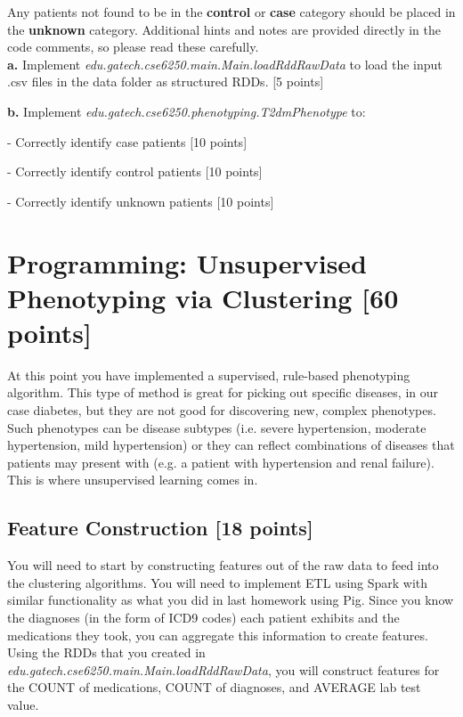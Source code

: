 \documentclass[12pt]{article}
\begin{document}
Any patients not found to be in the \textbf{control} or \textbf{case} category should be placed in the \textbf{unknown} category. Additional hints and notes are provided directly in the code comments, so please read these carefully. \\

\textbf{a.} Implement \textit{edu.gatech.cse6250.main.Main.loadRddRawData} to load the input .csv files in the data folder as structured RDDs. [5 points]
\newline

\textbf{b.}  Implement \textit{edu.gatech.cse6250.phenotyping.T2dmPhenotype} to:

 - Correctly identify case patients [10 points]
 
 - Correctly identify control patients [10 points]
 
 - Correctly identify unknown patients [10 points]

\section{Programming: Unsupervised Phenotyping via Clustering [60 points]}
At this point you have implemented a supervised, rule-based phenotyping algorithm. This type of method is great for picking out specific diseases, in our case diabetes, but they are not good for discovering new, complex phenotypes. Such phenotypes can be disease subtypes (i.e. severe hypertension, moderate hypertension, mild hypertension) or they can reflect combinations of diseases that patients may present with (e.g. a patient with hypertension and renal failure). This is where unsupervised learning comes in.

\subsection{Feature Construction [18 points]}
You will need to start by constructing features out of the raw data to feed into the clustering algorithms. You will need to implement ETL using Spark with similar functionality as what you did in last homework using Pig. Since you know the diagnoses (in the form of ICD9 codes) each patient exhibits and the medications they took, you can aggregate this information to create features. Using the RDDs that you created in \textit{edu.gatech.cse6250.main.Main.loadRddRawData}, you will construct features for the COUNT of medications, COUNT of diagnoses, and AVERAGE lab test value. \\
\end{document}
